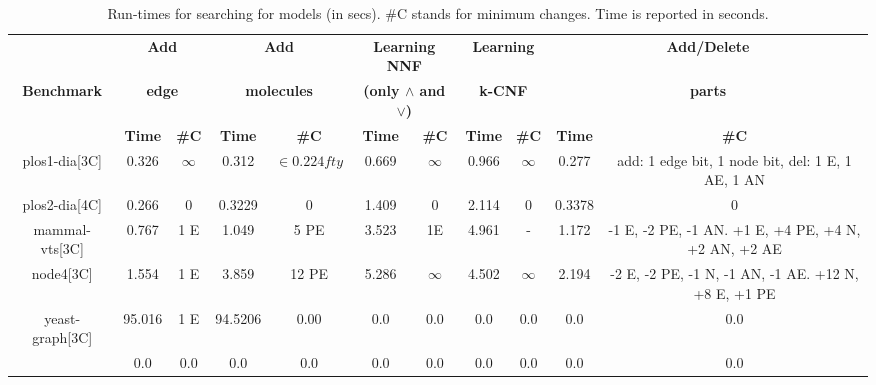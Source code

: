 \begin{table}[t]
  \centering
  \begin{tabular}[t]{|c@{}|@{}c@{}|@{}c@{}|@{}c@{}|@{}c@{}|@{}c@{}|@{}c@{}|@{}c@{}|@{}c@{}|@{}c@{}|@{}c@{}|}\hline
    {\multirow{2}{*} \textbf{}}  & \multicolumn{2}{c|}{\textbf{Add}} & \multicolumn{2}{c|}{\textbf{Add}} & \multicolumn{2}{c|}{\textbf{Learning NNF}}  &  \multicolumn{2}{c|}{\textbf{Learning}} &  \multicolumn{2}{c|}{\textbf{Add/Delete}} \\
    {\multirow{2}{*} \textbf{Benchmark}}  & \multicolumn{2}{c|}{\textbf{edge}} & \multicolumn{2}{c|}{\textbf{molecules}} & \multicolumn{2}{c|}{\textbf{(only $\land$ and $\lor$)}}  &  \multicolumn{2}{c|}{\textbf{k-CNF}} &  \multicolumn{2}{c|}{\textbf{parts}} \\
    \cline{2-11}
    {} & {\textbf{Time}} & {\textbf{\#C}} & {\textbf{Time}} & {\textbf{\#C}} & {\textbf{Time}} & {\textbf{\#C}} & {\textbf{Time}} & {\textbf{\#C}} & {\textbf{Time}} & {\textbf{\#C}} \\
    \hline
    
    plos1-dia[3C]& 0.326 &$\infty$& 0.312 &$\in0.224fty$& 0.669 & $\infty$ & 0.966 &$\infty$& 0.277 & add: 1 edge bit, 1 node bit, del: 1 E, 1 AE, 1 AN\\\hline
    plos2-dia[4C] & 0.266 & 0   & 0.3229 & 0  & 1.409  & 0 & 2.114 & 0 &  0.3378 & 0 \\\hline
    mammal-vts[3C]  & 0.767 & 1 E  & 1.049 & 5 PE & 3.523 & 1E & 4.961 & - & 1.172  & -1 E, -2 PE, -1 AN. +1 E, +4 PE, +4 N, +2 AN, +2 AE \\\hline
    node4[3C]  & 1.554  & 1 E   &  3.859 & 12 PE  &  5.286  & $\infty$ & 4.502 &$\infty$& 2.194  & -2 E, -2 PE, -1 N, -1 AN, -1 AE. +12 N, +8 E, +1 PE \\\hline
    yeast-graph[3C]   & 95.016    & 1 E   & 94.5206    & 0.00   & 0.0         & 0.0      & 0.0   & 0.0    & 0.0    & 0.0 \\\hline
       & 0.0    & 0.0    & 0.0    & 0.0    & 0.0         & 0.0      & 0.0   & 0.0    & 0.0    & 0.0\\\hline
  \end{tabular}
  \caption{Run-times for searching for models (in secs). \#C  stands for minimum changes.
  Time is reported in seconds.}
  \label{tab:qf-graph}
\end{table}

